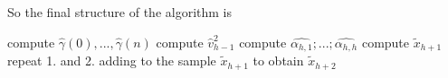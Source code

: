 So the final structure of the algorithm is
\begin{algorithm}
    \begin{algorithmic}[1]
        \State compute $\hat{\gamma}(0),...,\hat{\gamma}(n)$
            \State compute $\hat{v}_{h-1}^2$
            \State compute $\hat{\alpha_{h,1}};...;\hat{\alpha_{h,h}}$
            \State compute $\tilde{x}_{h+1}$
        \EndFor
                \State repeat 1. and 2. adding to the sample $\tilde{x}_{h+1}$ to obtain $\tilde{x}_{h+2}$
            \EndFor
        \EndIf
    \end{algorithmic}
\end{algorithm}
